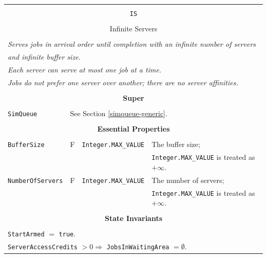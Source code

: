 \documentclass[12pt]{book}
\begin{document}
\begin{tabular}{|l|l|l|l|}
\hline
\multicolumn{4}{|c|}{} \\
\multicolumn{4}{|c|}{\lstinline[basicstyle=\large]{IS}} \\
\multicolumn{4}{|c|}{} \\
\multicolumn{4}{|c|}{Infinite Servers} \\
\multicolumn{4}{|c|}{} \\
\hline
\multicolumn{4}{|l|}{\em Serves jobs in arrival order until completion with an infinite number of servers} \\
\multicolumn{4}{|l|}{\em and infinite buffer size.} \\
\multicolumn{4}{|l|}{\em Each server can serve at most one job at a time.} \\
\multicolumn{4}{|l|}{\em Jobs do not prefer one server over another; there are no server affinities.} \\
\hline
\multicolumn{4}{|c|}{} \\
\multicolumn{4}{|c|}{\bf Super} \\
\multicolumn{4}{|c|}{} \\
\hline
\lstinline|SimQueue| & \multicolumn{3}{|l|}{See Section \ref{simqueue-generic}.} \\
\hline
\multicolumn{4}{|c|}{} \\
\multicolumn{4}{|c|}{\bf Essential Properties} \\
\multicolumn{4}{|c|}{} \\
\hline
\lstinline|BufferSize|      & F & \lstinline|Integer.MAX_VALUE|
                            & The buffer size; \\
                        & & & \lstinline|Integer.MAX_VALUE| is treated as $+\infty$. \\
\hline
\lstinline|NumberOfServers| & F & \lstinline|Integer.MAX_VALUE|
                            & The number of servers; \\
                        & & & \lstinline|Integer.MAX_VALUE| is treated as $+\infty$. \\
\hline
\multicolumn{4}{|c|}{} \\
\multicolumn{4}{|c|}{\bf State  Invariants} \\
\multicolumn{4}{|c|}{} \\
\hline
\multicolumn{4}{|l|}{\lstinline|StartArmed| $=$ \lstinline|true|.} \\
\multicolumn{4}{|l|}{\lstinline|ServerAccessCredits| $> 0 \Rightarrow$ \lstinline|JobsInWaitingArea| $= \emptyset$.} \\

\end{tabular}
\end{document}
